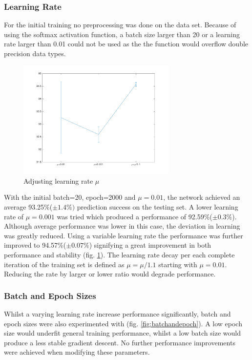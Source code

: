 \documentclass[11]{article}
\begin{document}
\subsubsection{Learning Rate}

For the initial training no preprocessing was done on the data set. Because of using the softmax activation function, a batch size larger than 20 or a learning rate larger than 0.01 could not be used as the the function would overflow double precision data types.

\begin{figure}[h]
\centering
\includegraphics[width=0.7\textwidth]{learning_rate.png}
\caption{Adjusting learning rate $\mu$}
\label{fig:learningrate}
\end{figure}

With the initial batch=20, epoch=2000 and $\mu=0.01$, the network achieved an average 93.25\%($\pm 1.4\%)$ prediction success on the testing set.  A lower learning rate of $\mu=0.001$ was tried which produced a performance of 92.59\%($\pm 0.3\%$). Although average performance was lower in this case, the deviation in learning was greatly reduced. Using a variable learning rate the performance was further improved to 94.57\%($\pm 0.07\%$) signifying a great improvement in both performance and stability (fig. \ref{fig:learningrate}). The learning rate decay per each complete iteration of the training set is defined as $\mu = \mu / 1.1$ starting with $\mu=0.01$. Reducing the rate by larger or lower ratio would degrade performance. 

\subsubsection{Batch and Epoch Sizes}
Whilst a varying learning rate increase performance significantly, batch and epoch sizes were also experimented with (fig. \ref{fig:batchandepoch}). A low epoch size would underfit general training performance, whilst a low batch size would produce a less stable gradient descent. No further performance improvements were achieved when modifying these parameters. 
\end{document}
